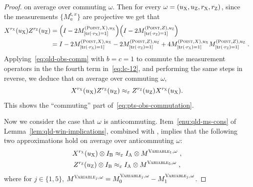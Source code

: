 \documentclass[11pt]{article}
\theoremstyle{definition}
\newcommand{\Id}{\ensuremath{I}}
\newcommand{\eps}{\varepsilon}
\DeclareMathOperator{\tr}{tr}
\newcommand{\labelstyle}[1]{\ensuremath{\textsc{#1}}\xspace}
\newcommand{\xpt}{\labelstyle{X}}
\newcommand{\zpt}{\labelstyle{Z}}
\newcommand{\tvarstyle}[1]{\mathsf{#1}}
\newcommand{\tvar}{\ensuremath{\tvarstyle{t}}}
\newcommand{\alice}{\labelstyle{A}}
\newcommand{\bob}{\labelstyle{B}}
\newcommand{\typestyle}[1]{\ensuremath{\textsc{#1}}\xspace}
\newcommand{\Point}{\typestyle{Point}}
\newcommand{\Variable}{\typestyle{Variable}}
\begin{document}
\begin{proof}
on average over commuting $\omega$. Then for every $\omega = (u_\xpt,u_\zpt,r_\xpt,r_\zpt)$, since the measurements $\{M^{\tvar,x}_a\}$ are projective we get that
\begin{align}
	X^{r_\xpt}(u_\xpt) Z^{r_\zpt}(u_\zpt) &= \Big ( \Id - 2 M^{(\Point,X),u_\xpt}_{[\tr(\cdot r_\xpt)=1]} \Big ) \Big ( \Id - 2 M^{(\Point,Z),u_\zpt}_{[\tr(\cdot r_\zpt)=1]}  \Big ) \notag\\
	&= I - 2 M^{(\Point,X),u_\xpt}_{[\tr(\cdot r_\xpt)=1]} - 2 M^{(\Point,Z),u_\zpt}_{[\tr(\cdot r_\zpt)=1]} + 4 M^{(\Point,X),u_\xpt}_{[\tr(\cdot r_\xpt)=1]} M^{(\Point,Z),u_\zpt}_{[\tr(\cdot r_\zpt)=1]}\;.\label{eq:lc-12}
\end{align}
Applying~\eqref{eq:qld-obs-comm} with $b = c = 1$ to commute the
measurement operators in the the fourth term
in~\eqref{eq:lc-12}, and performing the same steps in reverse, we deduce that on average over commuting $\omega$,
\[
	X^{r_\xpt}(u_\xpt) Z^{r_\zpt}(u_\zpt) \approx_\eps  Z^{r_\zpt}(u_\zpt) X^{r_\xpt}(u_\xpt).
\]
This shows the ``commuting'' part of~\eqref{eq:pts-obs-commutation}.

Now we consider the case that $\omega$ is anticommuting. Item~\ref{enu:qld-ms-cons} of Lemma~\ref{lem:qld-win-implications}, combined with , implies that the following two approximations hold on average over anticommuting $\omega$:
\begin{gather}
	X^{r_\xpt}(u_\xpt) \otimes \Id_\bob \approx_\eps \Id_\alice \otimes M^{\Variable_1,\omega} \;,\label{eq:lc-11a}\\
	Z^{r_\zpt}(u_\zpt) \otimes \Id_\bob \approx_\eps \Id_\alice \otimes M^{\Variable_5,\omega}\;,\label{eq:lc-11b}
\end{gather}
where for $j\in\{1,5\}$, $M^{\Variable_j,\omega} = M^{\Variable_j,\omega}_0-M^{\Variable_j,\omega}_1$.


\end{proof}
\end{document}
